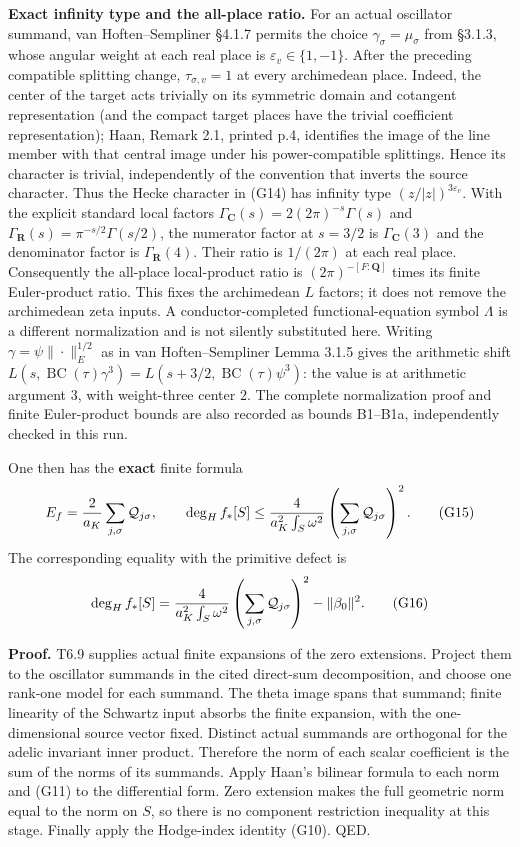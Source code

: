 \documentclass[11pt,a4paper]{article}
\theoremstyle{definition}
\begin{document}
\textbf{Exact infinity type and the all-place ratio.} For an actual oscillator summand, van Hoften--Sempliner §4.1.7 permits the choice \(\gamma_\sigma=\mu_\sigma\) from §3.1.3, whose angular weight at each real place is \(\varepsilon_v\in\{1,-1\}\). After the preceding compatible splitting change, \(\tau_{\sigma,v}=1\) at every archimedean place. Indeed, the center of the target acts trivially on its symmetric domain and cotangent representation (and the compact target places have the trivial coefficient representation); Haan, Remark 2.1, printed p.4, identifies the image of the line member with that central image under his power-compatible splittings. Hence its character is trivial, independently of the convention that inverts the source character. Thus the Hecke character in (G14) has infinity type \((z/|z|)^{3\varepsilon_v}\). With the explicit standard local factors \(\Gamma_{\mathbf C}(s)=2(2\pi)^{-s}\Gamma(s)\) and \(\Gamma_{\mathbf R}(s)=\pi^{-s/2}\Gamma(s/2)\), the numerator factor at \(s=3/2\) is \(\Gamma_{\mathbf C}(3)\) and the denominator factor is \(\Gamma_{\mathbf R}(4)\). Their ratio is \(1/(2\pi)\) at each real place. Consequently the all-place local-product ratio is \((2\pi)^{-[F:\mathbf Q]}\) times its finite Euler-product ratio. This fixes the archimedean \(L\) factors; it does not remove the archimedean zeta inputs. A conductor-completed functional-equation symbol \(\Lambda\) is a different normalization and is not silently substituted here. Writing \(\gamma=\psi\|\cdot\|_E^{1/2}\) as in van Hoften--Sempliner Lemma 3.1.5 gives the arithmetic shift \(L(s,\operatorname{BC}(\tau)\gamma^3)=L(s+3/2,\operatorname{BC}(\tau)\psi^3)\): the value is at arithmetic argument \(3\), with weight-three center \(2\). The complete normalization proof and finite Euler-product bounds are also recorded as bounds B1--B1a, independently checked in this run.

One then has the \textbf{exact} finite formula \[
E_f={2\over a_K}\sum_{j,\sigma}\mathcal Q_{j\sigma},
\qquad
\deg_H f_*[S]\le
{4\over a_K^2\int_S\omega^2}
\left(\sum_{j,\sigma}\mathcal Q_{j\sigma}\right)^2.
\tag{G15}
\] The corresponding equality with the primitive defect is \[
\deg_H f_*[S]=
{4\over a_K^2\int_S\omega^2}
\left(\sum_{j,\sigma}\mathcal Q_{j\sigma}\right)^2
-\|\beta_0\|^2.
\tag{G16}
\]

\textbf{Proof.} T6.9 supplies actual finite expansions of the zero extensions. Project them to the oscillator summands in the cited direct-sum decomposition, and choose one rank-one model for each summand. The theta image spans that summand; finite linearity of the Schwartz input absorbs the finite expansion, with the one-dimensional source vector fixed. Distinct actual summands are orthogonal for the adelic invariant inner product. Therefore the norm of each scalar coefficient is the sum of the norms of its summands. Apply Haan's bilinear formula to each norm and (G11) to the differential form. Zero extension makes the full geometric norm equal to the norm on \(S\), so there is no component restriction inequality at this stage. Finally apply the Hodge-index identity (G10). QED.
\end{document}
